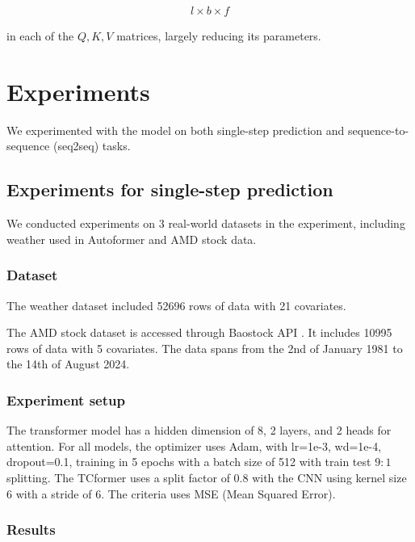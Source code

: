 \documentclass[stu,12pt,floatsintext]{apa7}
\begin{document}
\begin{gather}
    l\times b\times f
\end{gather}

in each of the $Q,K,V$ matrices, largely reducing its parameters.

\section{Experiments}
We experimented with the model on both single-step prediction and sequence-to-sequence (seq2seq) tasks. 

\subsection{Experiments for single-step prediction}

We conducted experiments on 3 real-world datasets in the experiment, including weather used in Autoformer \cite{autoformer} and AMD stock data. 

\subsubsection{Dataset}

The weather dataset included 52696 rows of data with 21 covariates. 

The AMD stock dataset is accessed through Baostock API \cite{baostock}. It includes 10995 rows of data with 5 covariates. The data spans from the 2nd of January 1981 to the 14th of August 2024. 

\subsubsection{Experiment setup}

The transformer model has a hidden dimension of 8, 2 layers, and 2 heads for attention. For all models, the optimizer uses Adam, with lr=1e-3, wd=1e-4, dropout=0.1, training in 5 epochs with a batch size of 512 with train test $9:1$ splitting. The TCformer uses a split factor of 0.8 with the CNN using kernel size 6 with a stride of 6. The criteria uses MSE (Mean Squared Error). 

\subsubsection{Results}
\end{document}
